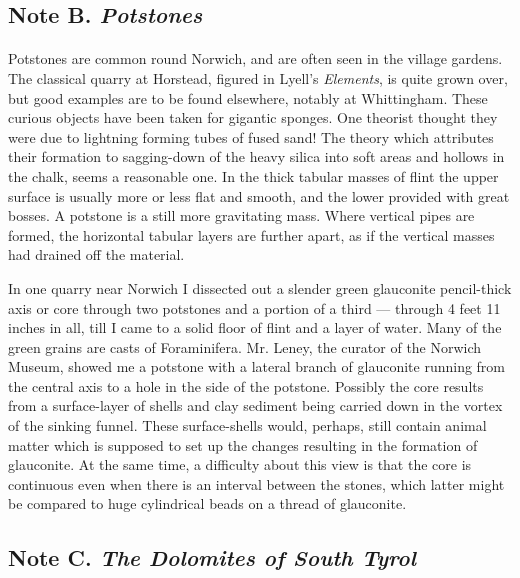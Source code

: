 \documentclass[a4paper, 12pt, oneside, landscape]{article}
\begin{document}
\subsection{Note B. \emph{Potstones}}
\paragraph{}
Potstones are common round Norwich, and are often seen in the village gardens. The classical quarry at Horstead, figured in Lyell's \emph{Elements}, is quite grown over, but good examples are to be found elsewhere, notably at Whittingham. These curious objects have been taken for gigantic sponges. One theorist thought they were due to lightning forming tubes of fused sand! The theory which attributes their formation to sagging-down of the heavy silica into soft areas and hollows in the chalk, seems a reasonable one. In the thick tabular masses of flint the upper surface is usually more or less flat and smooth, and the lower provided with great bosses. A potstone is a still more gravitating mass. Where vertical pipes are formed, the horizontal tabular layers are further apart, as if the vertical masses had drained off the material.

In one quarry near Norwich I dissected out a slender green glauconite pencil-thick axis or core through two potstones and a portion of a third --- through 4 feet 11 inches in all, till I came to a solid floor of flint and a layer of water. Many of the green grains are casts of Foraminifera. Mr. Leney, the curator of the Norwich Museum, showed me a potstone with a lateral branch of glauconite running from the central axis to a hole in the side of the potstone. Possibly the core results from a surface-layer of shells and clay sediment being carried down in the vortex of the sinking funnel. These surface-shells would, perhaps, still contain animal matter which is supposed to set up the changes resulting in the formation of glauconite. At the same time, a difficulty about this view is that the core is continuous even when there is an interval between the stones, which latter might be compared to huge cylindrical beads on a thread of glauconite.

\subsection{Note C. \emph{The Dolomites of South Tyrol}}
\end{document}
